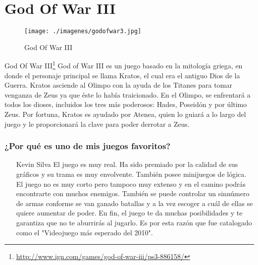 \section{God Of War III}

\begin{figure}[htbp]
\begin{center}
\texttt{[image: ./imagenes/godofwar3.jpg]}
\caption{God Of War III}
\label{God Of War III}
\end{center}
\end{figure}
God Of War III\footnote{\url{http://www.ign.com/games/god-of-war-iii/ps3-886158/}} God of War III es un juego basado en la mitología griega, en donde el personaje principal se llama Kratos, el cual era el antiguo Dios de la Guerra. Kratos asciende al Olimpo con la ayuda de los Titanes para tomar venganza de Zeus ya que éste lo había traicionado. En el Olimpo, se enfrentará a todos los dioses, incluidos los tres más poderosos: Hades, Poseidón y por último Zeus. Por fortuna, Kratos es ayudado por Atenea, quien lo guiará a lo largo del juego y le proporcionará la clave para poder derrotar a Zeus. 

\subsubsection{¿Por qué es uno de mis juegos favoritos?}
\begin{itemize}
\item[Kevin Silva] El juego es muy real. Ha sido premiado por la calidad de sus gráficos y su trama es muy envolvente. También posee minijuegos de lógica. El juego no es muy corto pero tampoco muy extenso y en el camino podrás encontrarte con muchos enemigos. También se puede controlar un sinnúmero de armas conforme se van ganado batallas y a la vez escoger a cuál de ellas se quiere aumentar de poder. En fin, el juego te da muchas posibilidades y te garantiza que no te aburrirás al jugarlo. Es por esta razón que fue catalogado como el "Videojuego más esperado del 2010".
\end{itemize}


